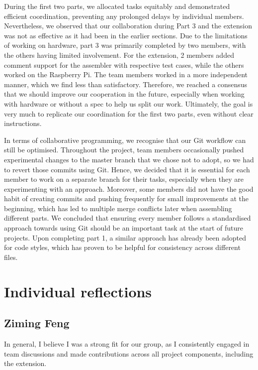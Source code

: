 \documentclass[9pt,a4paper]{article}
\begin{document}
During the first two parts, we allocated tasks equitably and demonstrated efficient coordination, preventing any prolonged delays by individual members.
Nevertheless, we observed that our collaboration during Part 3 and the extension was not as effective as it had been in the earlier sections.
Due to the limitations of working on hardware, part 3 was primarily completed by two members, with the others having limited involvement.
For the extension, 2 members added comment support for the assembler with respective test cases, while the others worked on the Raspberry Pi.
The team members worked in a more independent manner, which we find less than satisfactory. Therefore, we reached a consensus that we should improve our cooperation in the future, especially when working with hardware or without a spec to help us split our work.
Ultimately, the goal is very much to replicate our coordination for the first two parts, even without clear instructions.

In terms of collaborative programming, we recognise that our Git workflow can still be optimised.
Throughout the project, team members occasionally pushed experimental changes to the master branch that we chose not to adopt, so we had to revert those commits using Git.
Hence, we decided that it is essential for each member to work on a separate branch for their tasks, especially when they are experimenting with an approach.
Moreover, some members did not have the good habit of creating commits and pushing frequently for small improvements at the beginning, which has led to multiple merge conflicts later when assembling different parts.
We concluded that ensuring every member follows a standardised approach towards using Git should be an important task at the start of future projects.
Upon completing part 1, a similar approach has already been adopted for code styles, which has proven to be helpful for consistency across different files.

\section{Individual reflections}

\subsection{Ziming Feng}

In general, I believe I was a strong fit for our group, as I consistently engaged in team discussions and made contributions across all project components, including the extension.
\end{document}
